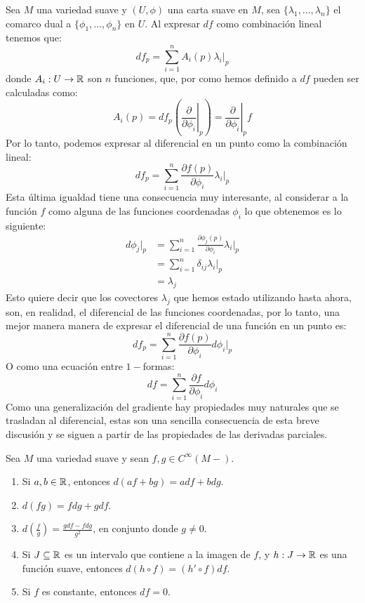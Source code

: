 Sea $M$ una variedad suave y $(U,\phi)$ una carta suave en $M$, sea $\{\lambda_1, \ldots, \lambda_n\}$ el comarco dual a $\{\phi_1,\ldots, \phi_n\}$ en $U$. Al expresar $df$ como combinación lineal tenemos que:\[
	df_p = \sum_{i=1}^n A_i(p) \lambda_i |_p
\]
donde $A_i: U \to \mathbb{R}$ son $n$ funciones, que, por como hemos definido a $df$ pueden ser calculadas como:
\[
	A_i(p)
	= df_p \left( \left. \frac{\partial}{\partial \phi_i} \right|_{p}\right)
	= \left. \frac{\partial}{\partial \phi_i} \right|_{p} f
\]
Por lo tanto, podemos expresar al diferencial en un punto como la combinación lineal:
\[
	df_p = \sum_{i=1}^n \frac{\partial f(p)}{\partial \phi_i} \lambda_i|_p
\]
Esta última igualdad tiene una consecuencia muy interesante, al considerar a la función $f$ como alguna de las funciones coordenadas $\phi_i$ lo que obtenemos es lo siguiente:
\begin{align*}
	d\phi_j|_p
	 & = \sum_{i=1}^n \frac{\partial \phi_j(p)}{\partial \phi_i} \lambda_i |_p \\
	 & = \sum_{i=1}^n \delta_{ij} \lambda_i|_p                                 \\
	 & = \lambda_j
\end{align*}
Esto quiere decir que los covectores $\lambda_j$ que hemos estado utilizando hasta ahora, son, en realidad, el diferencial de las funciones coordenadas, por lo tanto, una mejor manera manera de expresar el diferencial de una función en un punto es:
\[
	df_p = \sum_{i=1}^n \frac{\partial f(p)}{\partial \phi_i} d\phi_i |_p
\]
O como una ecuación entre $1-$formas:
\[
	df = \sum_{i=1}^n \frac{\partial f}{\partial \phi_i} d\phi_i
\]
Como una generalización del gradiente hay propiedades muy naturales que se trasladan al diferencial, estas son una sencilla consecuencia de esta breve discusión y se siguen a partir de las propiedades de las derivadas parciales.
\begin{corollary}
	Sea $M$ una variedad suave y sean $f,g \in C^{\infty}(M-)$.
	\begin{enumerate}
		\item Si $a,b \in \mathbb{R}$, entonces $d(af+bg) = adf + bdg$.
		\item $d(fg) = fdg + gdf$.
		\item $d(\frac{f}{g}) = \frac{gdf - fdg}{g^2}$, en conjunto donde $g \neq 0$.
		\item Si $J \subseteq \mathbb{R}$ es un intervalo que contiene a la imagen de $f$, y $h: J \to \mathbb{R}$ es una función suave, entonces $d(h \circ f) = (h' \circ f)df$.
		\item Si $f$ es constante, entonces $df = 0$.
	\end{enumerate}
\end{corollary}

